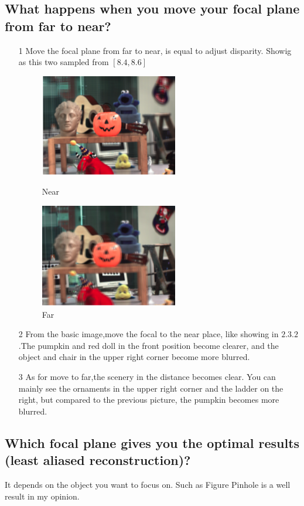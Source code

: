 \documentclass[letterpaper,12pt]{article}
\begin{document}
\subsection{What happens when you move your focal plane from far to near?}
\begin{itemize}
	\item[1]Move the focal plane from far to near, is equal to adjust disparity. Showig as this two sampled from $[8.4,8.6]$
		\begin{figure}[h]
		\centering
		\begin{minipage}[t]{0.48\textwidth}
			\centering
			\includegraphics[width=6cm]{Image/FF.png}
			\caption{Near}
		\end{minipage}
		\begin{minipage}[t]{0.48\textwidth}
			\centering
			\includegraphics[width=6cm]{Image/Far.png}
			\caption{Far}
		\end{minipage}
	\end{figure}
	\item[2]From the basic image,move the focal to the near place, like showing in $2.3.2$.The pumpkin and red doll in the front position become clearer, and the object and chair in the upper right corner become more blurred.
	\item[3]As for move to far,the scenery in the distance becomes clear. You can mainly see the ornaments in the upper right corner and the ladder on the right, but compared to the previous picture, the pumpkin becomes more blurred.
\end{itemize}
\subsection{Which focal plane gives you the optimal results (least aliased reconstruction)?}
It depends on the object you want to focus on. Such as Figure Pinhole is a well result in my opinion.
\end{document}
